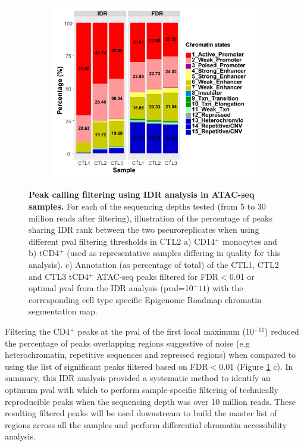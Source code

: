\begin{figure}[htbp]
\begin{subfigure}{0.65\textwidth}
\includegraphics[width=\textwidth]{./Results1/pdfs/stacked_barplot_chromatin_states_percent_CD4_qval_vs_PVAL_IDR_filtered}
\caption{\textbf{}} %
\end{subfigure}%
\caption[Peak calling filtering using IDR analysis in ATAC-seq samples.]{\textbf{Peak calling filtering using IDR analysis in ATAC-seq samples.} For each of the sequencing depths tested (from 5 to 30 million reads after filtering), illustration of the percentage of peaks sharing IDR rank between the two pseuroreplicates when using different pval filtering thresholds in CTL2 a) CD14$^+$ monocytes and b) tCD4$^+$ (used as representative samples differing in quality for this analysis). c) Annotation (as percentage of total) of the CTL1, CTL2 and CTL3 tCD4$^+$ ATAC-seq peaks filtered for FDR$<$0.01 or optimal pval from the IDR analysis (pval=10$^-11$) with the corresponding cell type specific Epigenome Roadmap chromatin segmentation map.}
\label{figure:Peak_calling_IDR_filtering_and_chrom_stated_ATAC}
\end{figure} 


Filtering the CD4$^+$ peaks at the pval of the first local maximum (10$^{-11}$) reduced the percentage of peaks overlapping regions suggestive of noise (e.g heterochromatin, repetitive sequences and repressed regions) when compared to using the list of significant peaks filtered based on FDR$<$0.01 (Figure \ref{figure:Peak_calling_IDR_filtering_and_chrom_stated_ATAC} c). In summary, this IDR analysis provided a systematic method to identify an optimum pval with which to perform sample-specific filtering of technically reproducible peaks when the sequencing depth was over 10 million reads. These resulting filtered peaks will be used downstream to build the master list of regions across all the samples and perform differential chromatin accessibility analysis. 

